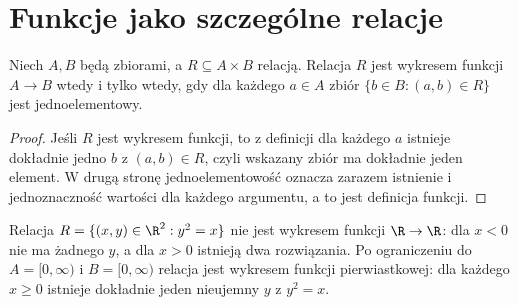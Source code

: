 \section{Funkcje jako szczególne relacje}
\begin{twierdzenie}
Niech $A,B$ będą zbiorami, a $R\subseteq A\times B$ relacją. Relacja $R$ jest wykresem funkcji $A\to B$ wtedy i tylko wtedy, gdy dla każdego $a\in A$ zbiór $\{b\in B:(a,b)\in R\}$ jest jednoelementowy.
\end{twierdzenie}
\begin{proof}
Jeśli $R$ jest wykresem funkcji, to z definicji dla każdego $a$ istnieje dokładnie jedno $b$ z $(a,b)\in R$, czyli wskazany zbiór ma dokładnie jeden element. W drugą stronę jednoelementowość oznacza zarazem istnienie i jednoznaczność wartości dla każdego argumentu, a to jest definicja funkcji.
\end{proof}
\begin{przyklad}
Relacja $R=\{(x,y)\in\R^2:y^2=x\}$ nie jest wykresem funkcji $\R\to\R$: dla $x<0$ nie ma żadnego $y$, a dla $x>0$ istnieją dwa rozwiązania. Po ograniczeniu do $A=[0,\infty)$ i $B=[0,\infty)$ relacja jest wykresem funkcji pierwiastkowej: dla każdego $x\ge0$ istnieje dokładnie jeden nieujemny $y$ z $y^2=x$.
\end{przyklad}